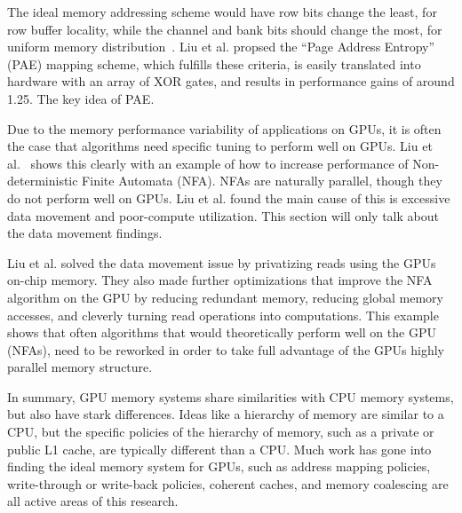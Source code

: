The ideal memory addressing scheme would have row bits change the least, for row buffer locality, while the channel and bank bits should change the most, for uniform memory distribution~\cite{Liu2018}.
Liu et al. propsed the ``Page Address Entropy'' (PAE) mapping scheme, which fulfills these criteria, is easily translated into hardware with an array of XOR gates, and results in performance gains of around 1.25.
The key idea of PAE.

Due to the memory performance variability of applications on GPUs, it is often the case that algorithms need specific tuning to perform well on GPUs.
Liu et al.~\cite{Liu2020} shows this clearly with an example of how to increase performance of Non-deterministic Finite Automata (NFA). NFAs are naturally parallel, though they do not perform well on GPUs. Liu et al. found the main cause of this is excessive data movement and poor-compute utilization. This section will only talk about the data movement findings.

Liu et al. solved the data movement issue by privatizing reads using the GPUs on-chip memory.
They also made further optimizations that improve the NFA algorithm on the GPU by reducing redundant memory, reducing global memory accesses, and cleverly turning read operations into computations.
This example shows that often algorithms that would theoretically perform well on the GPU (NFAs), need to be reworked in order to take full advantage of the GPUs highly parallel memory structure.

In summary, GPU memory systems share similarities with CPU memory systems, but also have stark differences.
Ideas like a hierarchy of memory are similar to a CPU, but the specific policies of the hierarchy of memory, such as a private or public L1 cache, are typically different than a CPU.
Much work has gone into finding the ideal memory system for GPUs, such as address mapping policies, write-through or write-back policies, coherent caches, and memory coalescing are all active areas of this research.
